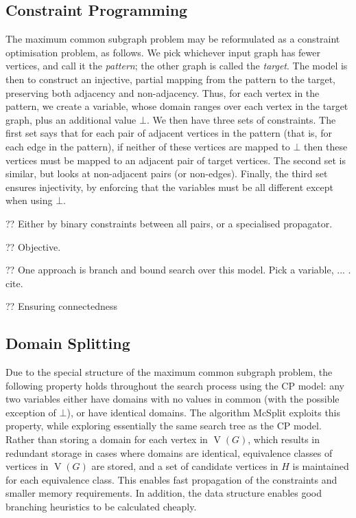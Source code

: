 \documentclass[sigconf]{acmart}
\begin{document}
\subsection{Constraint Programming}

The maximum common subgraph problem may be reformulated as a constraint optimisation problem, as
follows. We pick whichever input graph has fewer vertices, and call it the \emph{pattern}; the other
graph is called the \emph{target}. The model is then to construct an injective, partial mapping from
the pattern to the target, preserving both adjacency and non-adjacency. Thus, for each
vertex in the pattern, we create a variable, whose domain ranges over each vertex in the target
graph, plus an additional value $\bot$. We then have three sets of constraints. The first set says
that for each pair of adjacent vertices in the pattern (that is, for each edge in the pattern),
if neither of these vertices are mapped to $\bot$ then these vertices must be mapped to an adjacent
pair of target vertices. The second set is similar, but looks at non-adjacent pairs (or non-edges).
Finally, the third set ensures injectivity, by enforcing that the variables must be all different
except when using $\bot$.

?? Either by binary constraints between all pairs, or a specialised propagator.

?? Objective.

?? One approach is branch and bound search over this model. Pick a variable, ... . cite.

?? Ensuring connectedness

\subsection{Domain Splitting}

Due to the special structure of the maximum common subgraph problem, the following property holds
throughout the search process using the CP model: any two variables either have domains with no
values in common (with the possible exception of $\bot$), or have identical domains. The algorithm
McSplit exploits this property, while exploring essentially the same search tree as the CP model.
Rather than storing a domain for each vertex in $\operatorname{V}(G)$, which results in redundant
storage in cases where domains are identical, equivalence classes of vertices in
$\operatorname{V}(G)$ are stored, and a set of candidate vertices in $H$ is maintained for each
equivalence class. This enables fast propagation of the constraints and smaller memory requirements.
In addition, the data structure enables good branching heuristics to be calculated cheaply.
\end{document}
